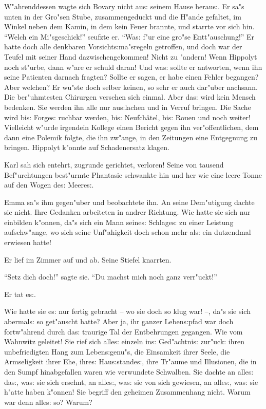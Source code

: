 \documentclass[oneside,12pt]{book}
\newcommand{\s}{s:}%
\begin{document}
W"ahrenddessen wagte sich Bovary nicht au{\s} seinem Hause
herau{\s}. Er sa"s unten in der Gro"sen Stube, zusammengeduckt und
die H"ande gefaltet, im Winkel neben dem Kamin, in dem kein Feuer
brannte, und starrte vor sich hin. "`Welch ein Mi"sgeschick!"'
seufzte er. "`Wa{\s} f"ur eine gro"se Entt"auschung!"' Er hatte
doch alle denkbaren Vorsicht{\s}ma"sregeln getroffen, und doch war
der Teufel mit seiner Hand dazwischengekommen! Nicht zu "andern!
Wenn Hippolyt noch st"urbe, dann w"are er schuld daran! Und wa{\s}
sollte er antworten, wenn ihn seine Patienten darnach fragten?
Sollte er sagen, er habe einen Fehler begangen? Aber welchen? Er
wu"ste doch selber keinen, so sehr er auch dar"uber nachsann. Die
ber"uhmtesten Chirurgen versehen sich einmal. Aber da{\s} wird
kein Mensch bedenken. Sie werden ihn alle nur au{\s}lachen und in
Verruf bringen. Die Sache wird bi{\s} Forge{\s} ruchbar werden,
bi{\s} Neufch\^atel, bi{\s} Rouen und noch weiter! Vielleicht
w"urde irgendein Kollege einen Bericht gegen ihn ver"offentlichen,
dem dann eine Polemik folgte, die ihn zw"ange, in den Zeitungen
eine Entgegnung zu bringen. Hippolyt k"onnte auf Schadenersatz
klagen.

Karl sah sich entehrt, zugrunde gerichtet, verloren! Seine von
tausend Bef"urchtungen best"urmte Phantasie schwankte hin und her
wie eine leere Tonne auf den Wogen de{\s} Meere{\s}.

Emma sa"s ihm gegen"uber und beobachtete ihn. An seine Dem"utigung
dachte sie nicht. Ihre Gedanken arbeiteten in andrer Richtung. Wie
hatte sie sich nur einbilden k"onnen, da"s sich ein Mann seine{\s}
Schlage{\s} zu einer Leistung aufschw"ange, wo sich seine
Unf"ahigkeit doch schon mehr al{\s} ein dutzendmal erwiesen hatte!

Er lief im Zimmer auf und ab. Seine Stiefel knarrten.

"`Setz dich doch!"' sagte sie. "`Du machst mich noch ganz
verr"uckt!"'

Er tat e{\s}.

Wie hatte sie e{\s} nur fertig gebracht -- wo sie doch so klug
war! --, da"s sie sich abermal{\s} so get"auscht hatte? Aber ja,
ihr ganzer Leben{\s}pfad war doch fortw"ahrend durch da{\s}
traurige Tal der Entbehrungen gegangen. Wie vom Wahnwitz geleitet!
Sie rief sich alle{\s} einzeln in{\s} Ged"achtni{\s} zur"uck:
ihren unbefriedigten Hang zum Leben{\s}genu"s, die Einsamkeit
ihrer Seele, die Armseligkeit ihrer Ehe, ihre{\s}
Hau{\s}stande{\s}, ihre Tr"aume und Illusionen, die in den Sumpf
hinabgefallen waren wie verwundete Schwalben. Sie dachte an
alle{\s} da{\s}, wa{\s} sie sich ersehnt, an alle{\s}, wa{\s} sie
von sich gewiesen, an alle{\s}, wa{\s} sie h"atte haben k"onnen!
Sie begriff den geheimen Zusammenhang nicht. Warum war denn
alle{\s} so? Warum?
\end{document}
